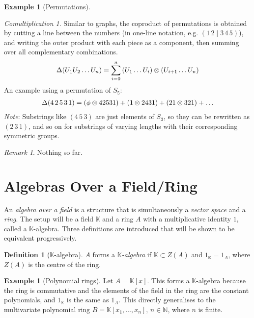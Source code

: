 \documentclass{article}
\theoremstyle{definition}
\newtheorem{Definition}{Definition}
\newtheorem{Example}{Example}
\newtheorem*{Example*}{Example}
\theoremstyle{remark}
\newtheorem*{Remark*}{Remark}
\theoremstyle{underline}
\theoremstyle{underline}
\newtheorem*{Comultiplication*}{Comultiplication}
\begin{document}
\begin{Example}[Permutations]
\begin{Comultiplication*}
Similar to graphs, the coproduct of permutations is obtained by cutting a line between the numbers (in one-line notation, e.g. $(1 \, 2 \mid 3\, 4\, 5)$), and writing the outer product with each piece as a component, then summing over all complementary combinations. 
\begin{gather*}
	\Delta\pqty{U_1 U_2 \ldots U_n} = \sum_{i=0}^n \pqty{U_1\ldots U_i} \otimes \pqty{U_{i+1}\ldots U_n}
\end{gather*}
An example using a permutation of $S_5$:
\begin{gather*}
	\Delta\pqty{4 \, 2 \, 5 \, 3 \, 1} = \pqty{\phi \otimes 42531} + \pqty{1 \otimes 2431} + \pqty{21 \otimes 321} + \ldots
\end{gather*}
\emph{Note}: Substrings like $(4 \, 5 \, 3)$ are just elements of $S_3$, so they can be rewritten as $(2 \, 3 \, 1)$, and so on for substrings of varying lengths with their corresponding symmetric groups. 
\end{Comultiplication*}

\begin{Remark*}
Nothing so far.
\end{Remark*}
\end{Example}

\section{Algebras Over a Field/Ring}

An \emph{algebra over a field} is a structure that is simultaneously a \emph{vector space} and a \emph{ring}. The setup will be a field $\mathbb K$ and a ring $A$ with a multiplicative identity $1$, called a $\mathbb K$-algebra.
Three definitions are introduced that will be shown to be equivalent progressively.

\begin{Definition}[$\mathbb K$-algebra]
$A$ forms a $\mathbb K$\emph{-algebra} if $\mathbb K \subset Z(A)$ and $1_{\mathbb K} = 1_A$, where $Z(A)$ is the centre of the ring.
\end{Definition}

\begin{Example*}[Polynomial rings]
Let $A = \mathbb K[x]$. This forms a $\mathbb K$-algebra because the ring is commutative and the elements of the field in the ring are the constant polynomials, and $1_{\mathbb K}$ is the same as $1_A$. This directly generalises to the multivariate polynomial ring $B = \mathbb K[x_1,\ldots,x_n],\, n \in \mathbb N$, where $n$ is finite.
\end{Example*}
\end{document}
